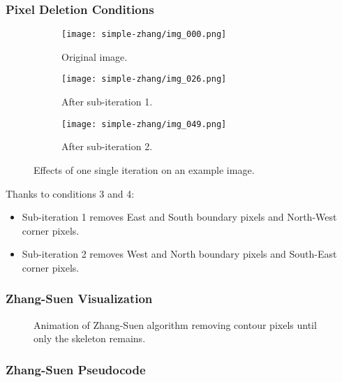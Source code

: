 \begin{frame}
  \frametitle{Pixel Deletion Conditions}
  \begin{figure}
    \centering
    \begin{subfigure}[b]{0.3\textwidth}
      \centering
      \texttt{[image: simple-zhang/img\_000.png]}
      \caption{Original image.}
    \end{subfigure}
    \hfill
    \begin{subfigure}[b]{0.3\textwidth}
      \centering
      \texttt{[image: simple-zhang/img\_026.png]}
      \caption{After sub-iteration 1.}
    \end{subfigure}
    \hfill
    \begin{subfigure}[b]{0.3\textwidth}
      \centering
      \texttt{[image: simple-zhang/img\_049.png]}
      \caption{After sub-iteration 2.}
    \end{subfigure}
    \caption{Effects of one single iteration on an example image.}
  \end{figure}
  Thanks to conditions 3 and 4:
  \begin{itemize}
    \item Sub-iteration 1 removes East and South boundary pixels and North-West corner pixels.
    \item Sub-iteration 2 removes West and North boundary pixels and South-East corner pixels.
  \end{itemize}
\end{frame}

\begin{frame}[c]
  \frametitle{Zhang-Suen Visualization}
  \centering
  \begin{figure}
  \caption{Animation of Zhang-Suen algorithm removing contour pixels until only the skeleton remains.}
  \end{figure}
\end{frame}

\begin{frame}
  \frametitle{Zhang-Suen Pseudocode}
  
\end{frame}
